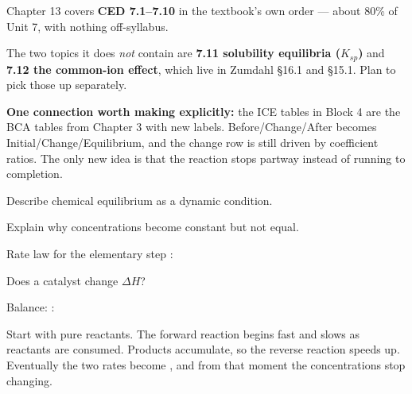 \documentclass{apchem-notes}
\begin{document}
\apctitleblock

\begin{apcnote}
Chapter 13 covers \textbf{CED 7.1--7.10} in the textbook's own order --- about
80\% of Unit 7, with nothing off-syllabus.

The two topics it does \emph{not} contain are \textbf{7.11 solubility
equilibria ($K_{sp}$)} and \textbf{7.12 the common-ion effect}, which live in
Zumdahl \S16.1 and \S15.1. Plan to pick those up separately.

\textbf{One connection worth making explicitly:} the ICE tables in Block 4
are the BCA tables from Chapter 3 with new labels. Before/Change/After
becomes Initial/Change/Equilibrium, and the change row is still driven by
coefficient ratios. The only new idea is that the reaction stops partway
instead of running to completion.
\end{apcnote}


\begin{objectives}
  \item Describe chemical equilibrium as a dynamic condition.
  \item Explain why concentrations become constant but not equal.
\end{objectives}


\begin{warmup}[3]
  \item Rate law for the elementary step :
  \item Does a catalyst change $\Delta H$? 
  \item Balance: :
\end{warmup}



Start with pure reactants. The forward reaction begins fast and slows as
reactants are consumed. Products accumulate, so the reverse reaction speeds
up. Eventually the two rates become
, and from that moment the concentrations stop
changing.
\end{document}
